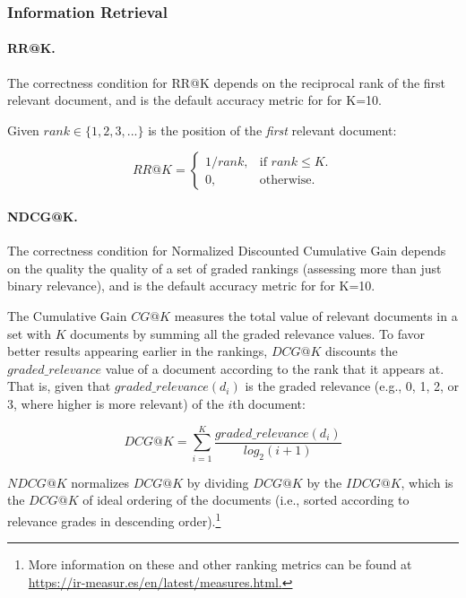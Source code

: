 \subsubsection{Information Retrieval}
\paragraph{RR@K.} 
The correctness condition for RR@K depends on the reciprocal rank of the first relevant document, and is the default accuracy metric for \msmarcoregular for K=10.

Given $rank \in \{1, 2, 3, ...\}$ is the position of the \textit{first} relevant document:

\begin{equation}
  RR@K=\begin{cases}
    1/rank, & \mbox{if $rank \leq K$}.\\
    0, & \mbox{otherwise}.
  \end{cases}
\end{equation}

\paragraph{NDCG@K.} 
The correctness condition for Normalized Discounted Cumulative Gain \cite[NDCG; ][]{jarvelin2002} depends on the quality the quality of a set of graded rankings (\ie assessing more than just binary relevance), and is the default accuracy metric for \msmarcotrec for K=10. 

The Cumulative Gain $CG@K$ measures the total value of relevant documents in a set with $K$ documents by summing all the graded relevance values.
To favor better results appearing earlier in the rankings, $DCG@K$ discounts the $graded\_relevance$ value of a document according to the rank that it appears at.
That is, given that $graded\_relevance(d_i)$ is the graded relevance (e.g., 0, 1, 2, or 3, where higher is more relevant) of the $i$th document:

\begin{equation}
  DCG@K=\sum_{i=1}^{K}{\dfrac{graded\_relevance(d_i)}{log_2(i+1)}}
\end{equation}

$NDCG@K$ normalizes $DCG@K$ by dividing $DCG@K$ by the $IDCG@K$, which is the $DCG@K$ of ideal ordering of the documents (i.e., sorted according to relevance grades in descending order).\footnote{More information on these and other ranking metrics can be found at \url{https://ir-measur.es/en/latest/measures.html.}}

